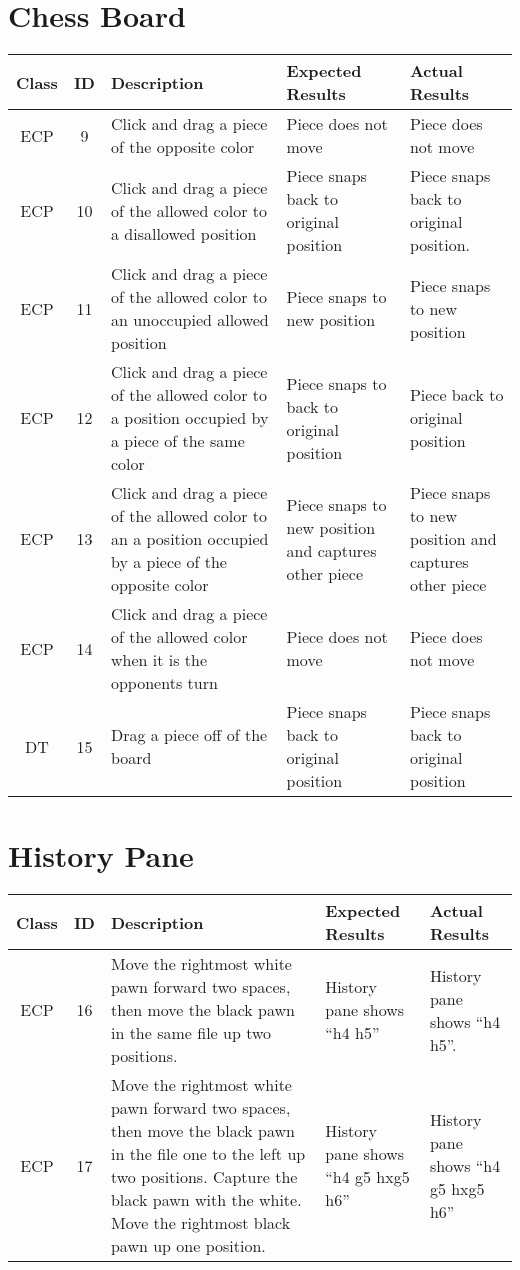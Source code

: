 \documentclass{article}
\begin{document}
\section{Chess Board}
\begin{center}
\begin{longtable}{|c|c|p{4cm}|p{4cm}|p{4cm}|}
\hline
Class & ID & Description & Expected Results & Actual Results \\ \hline
ECP & 9 & Click and drag a piece of the opposite color & Piece does not move & Piece does not move \\ \hline
ECP & 10 & Click and drag a piece of the allowed color to a disallowed position & Piece snaps back to original position
& Piece snaps back to original position. \\ \hline
ECP & 11 & Click and drag a piece of the allowed color to an unoccupied allowed position & Piece snaps to new position & Piece
snaps to new position \\ \hline
ECP & 12 & Click and drag a piece of the allowed color to a position occupied by a piece of the same color & Piece snaps
to back to original position & Piece back to original position \\ \hline
ECP & 13 & Click and drag a piece of the allowed color to an a position occupied by a piece of the opposite color &
Piece snaps to new position and captures other piece & Piece snaps to new position and captures other piece\\ \hline
ECP & 14 & Click and drag a piece of the allowed color when it is the opponents turn & Piece does not move & Piece does
not move \\ \hline
DT  & 15 & Drag a piece off of the board & Piece snaps back to original position & Piece snaps back to original position \\ \hline
\end{longtable}
\end{center}

\section{History Pane}
\begin{center}
\begin{longtable}{|c|c|p{4cm}|p{4cm}|p{4cm}|}
\hline
Class & ID & Description & Expected Results & Actual Results \\ \hline
ECP & 16 & Move the rightmost white pawn forward two spaces, then move the black pawn in the same file up two positions.
& History pane shows ``h4 h5'' & History pane shows ``h4 h5''. \\ \hline
ECP & 17 & Move the rightmost white pawn forward two spaces, then move the black pawn in the file one to the left up two
positions.  Capture the black pawn with the white.  Move the rightmost black pawn up one position. & History pane shows
``h4 g5 hxg5 h6'' & History pane shows ``h4 g5 hxg5 h6'' \\ \hline
\end{longtable}
\end{center}
\end{document}

